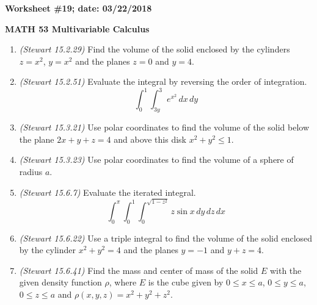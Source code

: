 \documentclass{article}
\begin{document}
{\bf Worksheet \#19; date: 03/22/2018}

{\bf MATH 53 Multivariable Calculus}

\begin{enumerate}
\item {\em (Stewart 15.2.29)} Find the volume of the solid enclosed by the cylinders $z = x^2$, $y = x^2$ and the planes $z = 0$ and $y = 4$.

\item {\em (Stewart 15.2.51)} Evaluate the integral by reversing the order of integration.
\[
\int_0^1 \int_{3y}^3 e^{x^2} \,dx \,dy
\]

\item {\em (Stewart 15.3.21)} Use polar coordinates to find the volume of the solid below the plane $2x + y + z = 4$ and above this disk $x^2 + y^2 \le 1$.

\item {\em (Stewart 15.3.23)} Use polar coordinates to find the volume of a sphere of radius $a$.

\item {\em (Stewart 15.6.7)} Evaluate the iterated integral.
\[
\int_0^\pi \int_0^1 \int_0^{\sqrt{1 - z^2}} z \sin x \,dy \,dz \,dx
\]

\item {\em (Stewart 15.6.22)} Use a triple integral to find the volume of the solid enclosed by the cylinder $x^2 + y^2 = 4$ and the planes $y = -1$ and $y + z = 4$.

\item {\em (Stewart 15.6.41)} Find the mass and center of mass of the solid $E$ with the given density function $\rho$, where $E$ is the cube given by $0 \le x \le a$, $0 \le y \le a$, $0 \le z \le a$ and $\rho(x, y, z) = x^2 + y^2 + z^2$.
\end{enumerate}
\end{document}
